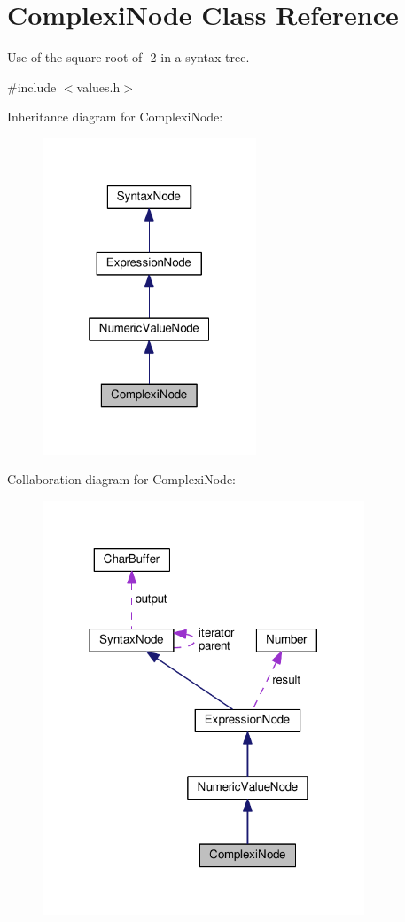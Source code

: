 \hypertarget{classComplexiNode}{}\section{Complexi\+Node Class Reference}
\label{classComplexiNode}


Use of the square root of -\/2 in a syntax tree.  




{\ttfamily \#include $<$values.\+h$>$}



Inheritance diagram for Complexi\+Node\+:\nopagebreak
\begin{figure}[H]
\begin{center}
\leavevmode
\includegraphics[width=181pt]{classComplexiNode__inherit__graph}
\end{center}
\end{figure}


Collaboration diagram for Complexi\+Node\+:\nopagebreak
\begin{figure}[H]
\begin{center}
\leavevmode
\includegraphics[width=272pt]{classComplexiNode__coll__graph}
\end{center}
\end{figure}
